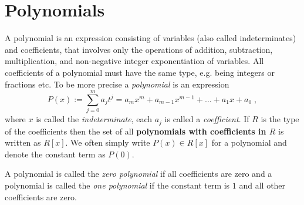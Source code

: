 \section{Polynomials}
A polynomial is an expression consisting of variables (also called indeterminates) and coefficients, that involves only the operations of addition, subtraction, multiplication, and non-negative integer exponentiation of variables. All coefficients of a polynomial must have the same type, e.g. being integers or fractions etc. To be more precise a \textit{polynomial} is an expression
\begin{equation}
P(x) := \sum _{j = 0} ^{m}{a} _{j}{t} ^{j} ={a} _{m}x^m +{a} _{m-1} x^{m-1} + \dots + a_1 x + a_0 \;,
\end{equation}
where $x$ is called the \textit{indeterminate}, each $ a_j$ is called a \textit{coefficient}. If $R$ is the type of the coefficients then the set of all \textbf{polynomials with coefficients in $R$} is written as $R[x]$. We often simply write $ P (x) \in R[x]$ for a polynomial and denote the constant term as $ P(0)$. 

A polynomial is called the \textit{zero polynomial} if all coefficients are zero and a polynomial is called the \textit{one polynomial} if the constant term is $1$ and all other coefficients are zero.

